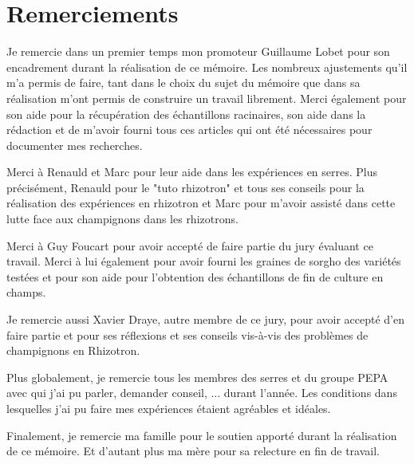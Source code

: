 \section*{Remerciements}
\thispagestyle{empty}

Je remercie dans un premier temps mon promoteur Guillaume Lobet pour son encadrement durant la réalisation de ce mémoire.
Les nombreux ajustements qu'il m'a permis de faire, tant dans le choix du sujet du mémoire que dans sa réalisation m'ont permis de construire un travail librement.
Merci également pour son aide pour la récupération des échantillons racinaires, son aide dans la rédaction et de m'avoir fourni tous ces articles qui ont été nécessaires pour documenter mes recherches.
\newline

Merci à Renauld et Marc pour leur aide dans les expériences en serres.
Plus précisément, Renauld pour le "tuto rhizotron" et tous ses conseils pour la réalisation des expériences en rhizotron et Marc pour m'avoir assisté dans cette lutte face aux champignons dans les rhizotrons.
\newline

Merci à Guy Foucart pour avoir accepté de faire partie du jury évaluant ce travail.
Merci à lui également pour avoir fourni les graines de sorgho des variétés testées et pour son aide pour l'obtention des échantillons de fin de culture en champs.
\newline

Je remercie aussi Xavier Draye, autre membre de ce jury, pour avoir accepté d'en faire partie et pour ses réflexions et ses conseils vis-à-vis des problèmes de champignons en Rhizotron.
\newline

Plus globalement, je remercie tous les membres des serres et du groupe PEPA avec qui j'ai pu parler, demander conseil, ... durant l'année. 
Les conditions dans lesquelles j'ai pu faire mes expériences étaient agréables et idéales.
\newline

Finalement, je remercie ma famille pour le soutien apporté durant la réalisation de ce mémoire.
Et d'autant plus ma mère pour sa relecture en fin de travail.